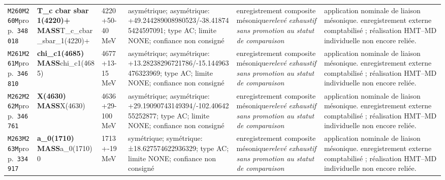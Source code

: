 \begin{landscape}
\begin{longtable}{L{1.85cm}L{4.45cm}L{2.35cm}L{4.05cm}L{3.35cm}L{7.15cm}}
\texttt{M260}\newline \texttt{M260M}\newline prop.\ \texttt{348018} & \textbf{T\_\allowbreak{}c cbar sbar 1(4220)+ MASS}\newline T\_\allowbreak{}c\_\allowbreak{}cbar\_\allowbreak{}sbar\_\allowbreak{}1(4220)+ & 4220+50-40\,MeV & asymétrique; asymétrique: +49.244289008980523/-38.418745424597091; type AC; limite NONE; confiance non consigné & enregistrement composite mésonique\newline \emph{relevé exhaustif sans promotion au statut de comparaison} & application nominale de liaison mésonique. enregistrement externe comptabilisé ; réalisation HMT--MD individuelle non encore reliée. \\
\texttt{M261}\newline \texttt{M261M}\newline prop.\ \texttt{346810} & \textbf{chi\_\allowbreak{}c1(4685) MASS}\newline chi\_\allowbreak{}c1(4685) & 4677+13-15\,MeV & asymétrique; asymétrique: +13.28238296721786/-15.144963476323969; type AC; limite NONE; confiance non consigné & enregistrement composite mésonique\newline \emph{relevé exhaustif sans promotion au statut de comparaison} & application nominale de liaison mésonique. enregistrement externe comptabilisé ; réalisation HMT--MD individuelle non encore reliée. \\
\texttt{M262}\newline \texttt{M262M}\newline prop.\ \texttt{346761} & \textbf{X(4630) MASS}\newline X(4630) & 4636+29-100\,MeV & asymétrique; asymétrique: +29.19090743149394/-102.4064255252877; type AC; limite NONE; confiance non consigné & enregistrement composite mésonique\newline \emph{relevé exhaustif sans promotion au statut de comparaison} & application nominale de liaison mésonique. enregistrement externe comptabilisé ; réalisation HMT--MD individuelle non encore reliée. \\
\texttt{M263}\newline \texttt{M263M}\newline prop.\ \texttt{334917} & \textbf{a\_\allowbreak{}0(1710) MASS}\newline a\_\allowbreak{}0(1710)0 & 1713+-19\,MeV & symétrique; symétrique: ±18.627574622936329; type AC; limite NONE; confiance non consigné & enregistrement composite mésonique\newline \emph{relevé exhaustif sans promotion au statut de comparaison} & application nominale de liaison mésonique. enregistrement externe comptabilisé ; réalisation HMT--MD individuelle non encore reliée. \\

\end{longtable}
\end{landscape}
